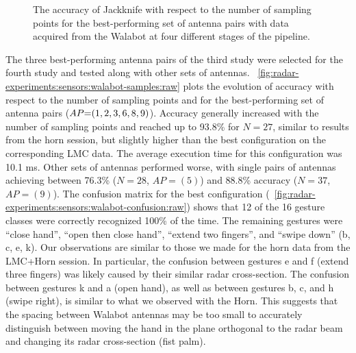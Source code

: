 \begin{figure}[!t]
    \vspace{-6pt}
    \caption{The accuracy of Jackknife with respect to the number of sampling points for the best-performing set of antenna pairs with data acquired from the Walabot at four different stages of the pipeline.}
    \label{fig:radar-experiments:sensors:walabot-samples}
\end{figure}


The three best-performing antenna pairs of the third study were selected for the fourth study and tested along with other sets of antennas. 
%
\fig~\ref{fig:radar-experiments:sensors:walabot-samples:raw} plots the evolution of accuracy with respect to the number of sampling points and for the best-performing set of antenna pairs ($\splitatcommas{AP{=}(1, 2, 3, 6, 8, 9)}$). 
%
Accuracy generally increased with the number of sampling points and reached up to 93.8\% for $N{=}27$, similar to results from the horn session, but slightly higher than the best configuration on the corresponding LMC data. The average execution time for this configuration was 10.1 ms.
%
Other sets of antennas performed worse, with single pairs of antennas achieving between 76.3\% ($N{=}28$, $AP{=}(5)$) and 88.8\% accuracy ($N{=}37$, $AP{=}(9)$).
%
The confusion matrix for the best configuration (\fig~\ref{fig:radar-experiments:sensors:walabot-confusion:raw}) shows that 12 of the 16 gesture classes were correctly recognized 100\% of the time. The remaining gestures were ``close hand'', ``open then close hand'', ``extend two fingers'', and ``swipe down'' (b, c, e, k). Our observations are similar to those we made for the horn data from the LMC+Horn session.
%
In particular, the confusion between gestures e and f (extend three fingers) was likely caused by their similar radar cross-section. 
%
The confusion between gestures k and a (open hand), as well as between gestures b, c, and h (swipe right), is similar to what we observed with the Horn. This suggests that the spacing between Walabot antennas may be too small to accurately distinguish between moving the hand in the plane orthogonal to the radar beam and changing its radar cross-section (\eg fist \vs palm).



